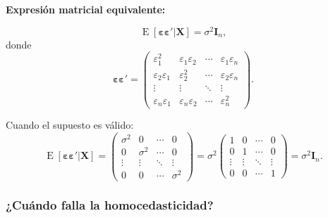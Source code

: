 \documentclass[11pt,a4paper]{article}
\DeclareMathOperator{\E}{E}
\begin{document}
\noindent\textbf{Expresión matricial equivalente:}

\[
\E[\boldsymbol{\varepsilon}\boldsymbol{\varepsilon}'|\mathbf{X}] = \sigma^2 \mathbf{I}_n,
\]
donde
\[
\boldsymbol{\varepsilon}\boldsymbol{\varepsilon}' = \begin{pmatrix}
\varepsilon_1^2 & \varepsilon_1\varepsilon_2 & \cdots & \varepsilon_1\varepsilon_n\\
\varepsilon_2\varepsilon_1 & \varepsilon_2^2 & \cdots & \varepsilon_2\varepsilon_n\\
\vdots & \vdots & \ddots & \vdots\\
\varepsilon_n\varepsilon_1 & \varepsilon_n\varepsilon_2 & \cdots & \varepsilon_n^2
\end{pmatrix}.
\]

Cuando el supuesto es válido:
\[
\E[\boldsymbol{\varepsilon}\boldsymbol{\varepsilon}'|\mathbf{X}] = \begin{pmatrix}
\sigma^2 & 0 & \cdots & 0\\
0 & \sigma^2 & \cdots & 0\\
\vdots & \vdots & \ddots & \vdots\\
0 & 0 & \cdots & \sigma^2
\end{pmatrix} = \sigma^2 \begin{pmatrix}
1 & 0 & \cdots & 0\\
0 & 1 & \cdots & 0\\
\vdots & \vdots & \ddots & \vdots\\
0 & 0 & \cdots & 1
\end{pmatrix} = \sigma^2 \mathbf{I}_n.
\]

\subsubsection*{¿Cuándo falla la homocedasticidad?}
\end{document}
